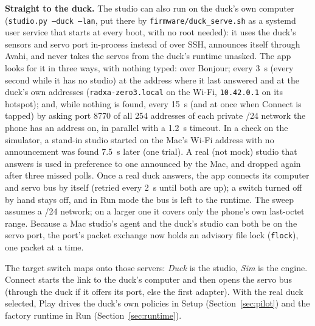 \documentclass[11pt]{article}
\begin{document}
\textbf{Straight to the duck.} The studio can also run on the duck's own computer (\texttt{studio.py --duck
--lan}, put there by \texttt{firmware/duck\_serve.sh} as a systemd user service that starts at every boot, with
no root needed): it uses the duck's sensors and servo port in-process instead
of over SSH, announces itself through Avahi, and never takes the servos from the duck's runtime unasked. The app
looks for it in three ways, with nothing typed: over Bonjour; every 3~s (every second while it has no studio) at the address where it last answered and
at the duck's own addresses (\texttt{radxa-zero3.local} on the Wi-Fi, \texttt{10.42.0.1} on its hotspot); and, while
nothing is found, every 15~s (and at once when Connect is tapped) by asking port 8770 of all 254 addresses of each
private /24 network the phone has an address on, in parallel with a 1.2~s timeout. In a check on the simulator, a stand-in studio started on the
Mac's Wi-Fi address with no announcement was found 7.5~s later (one trial). A real (not mock) studio that
answers is used in preference to one announced by the Mac, and dropped again after three missed polls. Once a
real duck answers, the app connects its computer and servo bus by itself (retried every 2~s until both are up); a
switch turned off by hand stays off, and in Run mode the bus is left to the runtime. The sweep
assumes a /24 network; on a larger one it covers only the phone's own last-octet range. Because a Mac studio's agent and the duck's studio can both be on the servo
port, the port's packet exchange now holds an advisory file lock (\texttt{flock}), one packet at a time.

The target switch maps onto those servers: \emph{Duck} is the studio, \emph{Sim} is the engine. Connect starts the
link to the duck's computer and then opens the servo bus (through the duck if it offers its port, else the first
adapter). With the real duck selected, Play drives the duck's own policies in Setup (Section~\ref{sec:pilot})
and the factory runtime in Run (Section~\ref{sec:runtime}).
\end{document}
